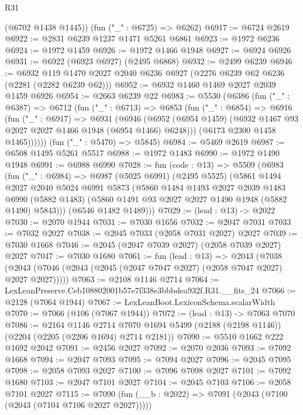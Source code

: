 \begin{lexlean}{R31}
\begin{coremodule}
      (@6702 @1438 @1445))
    (fun ("_" : @6725) => @6262)
@6917 := @6724 @2619
@6922 := @2831 @6239 @1237 @1471 @5261 @6861
@6923 := @1972 @6236
@6924 := @1972 @1459
@6926 := @1972 @1466 @1948
@6927 := @6924 @6926
@6931 := @6922 (@6923 @6927) (@2495 @6868)
@6932 := @2499 @6239
@6946 := @6932 @119 @1470 @2027 @2040 @6236 @6927 (@2276 @6239 @62 @6236 (@2281 (@2282 @6239 @62)))
@6952 := @6932 @1460 @1469 @2027 @2039 @1459 @6926
@6954 := @2663 @6239 @22
@6983 := @5530
    (@6386
      (fun ("_" : @6387) =>
      @6712
        (fun ("_" : @6713) =>
        @6853
          (fun ("_" : @6854) =>
          @6916
            (fun ("_" : @6917) =>
            @6931
              (@6946
                (@6952 (@6954 @1459) (@6932 @1467 @93 @2027 @2027 @1466 @1948 (@6954 @1466) @6248)))
              (@6173 @2300 @1458 @1465))))))
    (fun ("_" : @5470) => @5845)
@6984 := @5469 @2619
@6987 := @6508 @1495 @5261 @5517
@6988 := @1972 @1483
@6990 := @1972 @1490 @1948
@6991 := @6988 @6990
@7028 := fun (code : @13) =>
  @5509
    (@6983
      (fun ("_" : @6984) =>
      @6987
        (@5025 @6991)
        (@2495 @5525)
        (@5861
          @1494
          @2027
          @2040
          @5024
          @6991
          @5873
          (@5860
            @1484
            @1493
            @2027
            @2039
            @1483
            @6990
            (@5882 @1483)
            (@5860 @1491 @93 @2027 @2027 @1490 @1948 (@5882 @1490) @5843)))
        (@6546 @1482 @1489)))
@7029 := (lead : @13) -> @2022
@7030 := @2070 @1944
@7031 := @7030 @1656
@7032 := @2047 @7031
@7033 := @7032 @2027
@7038 := @2045 @7033 (@2058 @7031 @2027) @2027
@7039 := @7030 @1668
@7046 := @2045 (@2047 @7039 @2027) (@2058 @7039 @2027) @2027
@7047 := @7030 @1680
@7061 := fun (lead : @13) =>
  @2043 (@7038 (@2043 (@7046 (@2043 (@2045 (@2047 @7047 @2027) (@2058 @7047 @2027) @2027 @2027)))))
@7063 := @2108 @1146 @2714
@7064 := LexLeanPreserve.Ceb108802001b57e7f338e3bbbdea932f.R31.__fits_24
@7066 := @2128 (@7064 @1944)
@7067 := LexLeanBoot.LexiconSchema.scalarWidth
@7070 := @7066 (@106 (@7067 @1944))
@7072 := (lead : @13) -> @7063 @7070
@7086 := @2164
    @1146
    @2714
    @7070
    @1694
    @5499
    (@2188 (@2198 @1146))
    (@2204 (@2205 (@2206 @1694) @2714 @2181))
@7090 := @5510 @1662 @222 @1692 @2042
@7091 := @2456 @2027
@7092 := @2070 @2036
@7093 := @7092 @1668
@7094 := @2047 @7093
@7095 := @7094 @2027
@7096 := @2045 @7095
@7098 := @2058 @7093 @2027
@7100 := @7096 @7098 @2027
@7101 := @7092 @1680
@7103 := @2047 @7101 @2027
@7104 := @2045 @7103
@7106 := @2058 @7101 @2027
@7115 := @7090 (fun (__b : @2022) => @7091 (@2043 (@7100 (@2043 (@7104 @7106 @2027 @2027)))))

\end{coremodule}
\end{lexlean}
